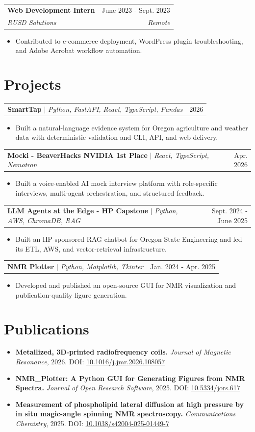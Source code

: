 \documentclass[letterpaper,10pt]{article}
\newcommand{\entry}[4]{
  \begin{tabularx}{\textwidth}{Xr}
    \textbf{#1} & #2 \\
    \textit{#3} & \textit{#4}
  \end{tabularx}\vspace{-3pt}
}
\newcommand{\project}[3]{
  \begin{tabularx}{\textwidth}{Xr}
    \textbf{#1} $|$ \textit{#2} & #3
  \end{tabularx}\vspace{-3pt}
}
\newenvironment{tightitems}{
  \begin{itemize}[leftmargin=0.18in, topsep=2pt, itemsep=0pt, parsep=0pt, partopsep=0pt]
}{
  \end{itemize}\vspace{-2pt}
}
\begin{document}
\entry{Web Development Intern}{June 2023 - Sept. 2023}{RUSD Solutions}{Remote}
\begin{tightitems}
  \item Contributed to e-commerce deployment, WordPress plugin troubleshooting, and Adobe Acrobat workflow automation.
\end{tightitems}

\section{Projects}
\project{SmartTap}{Python, FastAPI, React, TypeScript, Pandas}{2026}
\begin{tightitems}
  \item Built a natural-language evidence system for Oregon agriculture and weather data with deterministic validation and CLI, API, and web delivery.
\end{tightitems}

\project{Mocki - BeaverHacks NVIDIA 1st Place}{React, TypeScript, Nemotron}{Apr. 2026}
\begin{tightitems}
  \item Built a voice-enabled AI mock interview platform with role-specific interviews, multi-agent orchestration, and structured feedback.
\end{tightitems}

\project{LLM Agents at the Edge - HP Capstone}{Python, AWS, ChromaDB, RAG}{Sept. 2024 - June 2025}
\begin{tightitems}
  \item Built an HP-sponsored RAG chatbot for Oregon State Engineering and led its ETL, AWS, and vector-retrieval infrastructure.
\end{tightitems}

\project{NMR Plotter}{Python, Matplotlib, Tkinter}{Jan. 2024 - Apr. 2025}
\begin{tightitems}
  \item Developed and published an open-source GUI for NMR visualization and publication-quality figure generation.
\end{tightitems}

\section{Publications}
\begin{tightitems}
  \item \textbf{Metallized, 3D-printed radiofrequency coils.} \textit{Journal of Magnetic Resonance}, 2026. DOI: \href{https://doi.org/10.1016/j.jmr.2026.108057}{10.1016/j.jmr.2026.108057}
  \item \textbf{NMR\_Plotter: A Python GUI for Generating Figures from NMR Spectra.} \textit{Journal of Open Research Software}, 2025. DOI: \href{https://doi.org/10.5334/jors.617}{10.5334/jors.617}
  \item \textbf{Measurement of phospholipid lateral diffusion at high pressure by in situ magic-angle spinning NMR spectroscopy.} \textit{Communications Chemistry}, 2025. DOI: \href{https://doi.org/10.1038/s42004-025-01449-7}{10.1038/s42004-025-01449-7}
\end{tightitems}
\end{document}
